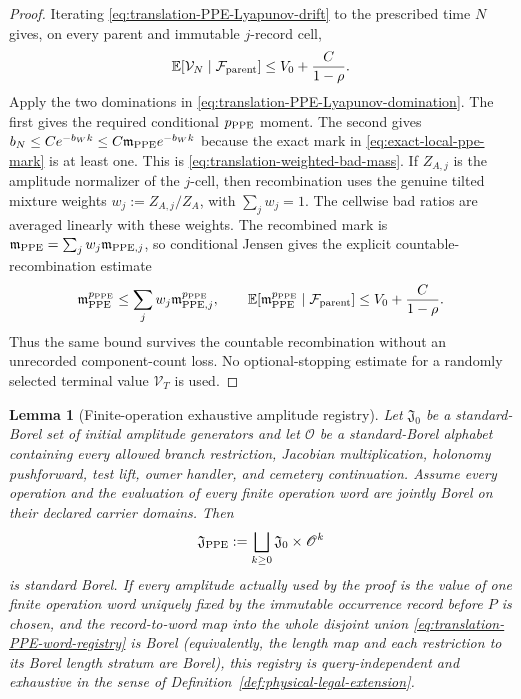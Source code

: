\documentclass[11pt]{article}
\newtheorem{lemma}[theorem]{Lemma}
\begin{document}
\begin{proof}
Iterating \eqref{eq:translation-PPE-Lyapunov-drift} to the prescribed time
$N$ gives, on every parent and immutable $j$-record cell,
\[
 \mathbb E[\mathcal V_N\mid\mathcal F_{\rm parent}]
 \le V_0+\frac C{1-\rho}.
\]
Apply the two dominations in
\eqref{eq:translation-PPE-Lyapunov-domination}.  The first gives the required
conditional $p_{\rm PPE}$ moment.  The second gives
$b_N\le C e^{-b_Wk}\le C\mathfrak m_{\rm PPE}e^{-b_Wk}$ because the exact
mark in \eqref{eq:exact-local-ppe-mark} is at least one.  This is
\eqref{eq:translation-weighted-bad-mass}.  If $Z_{A,j}$ is the amplitude
normalizer of the $j$-cell, then recombination uses the genuine tilted
mixture weights $w_j:=Z_{A,j}/Z_A$, with $\sum_jw_j=1$.  The cellwise bad
ratios are averaged linearly with these weights.  The recombined mark is
$\mathfrak m_{\rm PPE}=\sum_jw_j\mathfrak m_{{\rm PPE},j}$, so conditional
Jensen gives the explicit countable-recombination estimate
\begin{equation}
\label{eq:translation-PPE-recombination-Jensen}
 \mathfrak m_{\rm PPE}^{p_{\rm PPE}}
 \le\sum_jw_j\mathfrak m_{{\rm PPE},j}^{p_{\rm PPE}},
 \qquad
 \mathbb E[\mathfrak m_{\rm PPE}^{p_{\rm PPE}}
       \mid\mathcal F_{\rm parent}]
 \le V_0+\frac C{1-\rho}.
\end{equation}
Thus the same bound survives the countable recombination without an
unrecorded component-count loss.  No optional-stopping estimate for a
randomly selected terminal value $\mathcal V_T$ is used.
\end{proof}

\begin{lemma}[Finite-operation exhaustive amplitude registry]
\label{lem:translation-PPE-finite-word-registry}
Let $\mathfrak J_0$ be a standard-Borel set of initial amplitude generators
and let $\mathscr O$ be a standard-Borel alphabet containing every allowed
branch restriction, Jacobian multiplication, holonomy pushforward, test
lift, owner handler, and cemetery continuation.  Assume every operation and
the evaluation of every finite operation word are jointly Borel on their
declared carrier domains.  Then
\begin{equation}
\label{eq:translation-PPE-word-registry}
 \mathfrak J_{\rm PPE}
 :=\bigsqcup_{k\ge0}\mathfrak J_0\times\mathscr O^k
\end{equation}
is standard Borel.  If every amplitude actually used by the proof is the
value of one finite operation word uniquely fixed by the immutable
occurrence record before $P$ is chosen, and the record-to-word map into
the whole disjoint union \eqref{eq:translation-PPE-word-registry} is Borel
(equivalently, the length map and each restriction to its Borel length
stratum are Borel), this registry is query-independent and exhaustive in the sense of
Definition~\ref{def:physical-legal-extension}.
\end{lemma}
\end{document}
